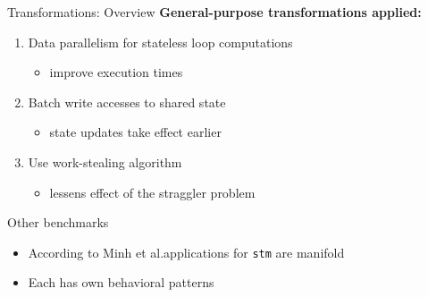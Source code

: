 \documentclass[aspectratio=169, usenames, dvipsnames]{beamer}
\begin{document}
\begin{frame}{Transformations: Overview}
  \textbf{General-purpose transformations applied:}\\

  \begin{enumerate}
    \item<2-> Data parallelism for stateless loop computations
    \begin{itemize}
      \item<2-> improve execution times\\[1.1\baselineskip]
    \end{itemize}
    \item<3-> Batch write accesses to shared state
    \begin{itemize}
      \item<3-> state updates take effect earlier\\[1.1\baselineskip]
    \end{itemize}
    \item<4-> Use work-stealing algorithm
    \begin{itemize}
      \item<4-> lessens effect of the straggler problem
    \end{itemize}
  \end{enumerate}
\end{frame}

\begin{frame}{Other benchmarks}
  \begin{itemize}
    \item According to Minh et al.\footnotemark[2] applications for \alert{\texttt{stm}} are manifold\\[\baselineskip]
    \item<2-> Each has own behavioral patterns\\
  \end{itemize}
\end{frame}
\end{document}
